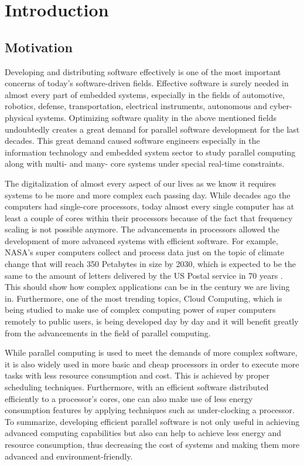 
\chapter{Introduction} \label{introductionchapter}
\section{Motivation}
Developing and distributing software effectively is one of the most important concerns of today's software-driven fields. Effective software is surely needed in almost every part of embedded systems, especially in the fields of automotive, robotics, defense, transportation, electrical instruments, autonomous and cyber-physical systems. Optimizing software quality in the above mentioned fields undoubtedly creates a great demand for parallel software development for the last decades. This great demand caused software engineers especially in the information technology and embedded system sector to study parallel computing along with multi- and many- core systems under special real-time constraints.

The digitalization of almost every aspect of our lives as we know it requires systems to be more and more complex each passing day. While decades ago the computers had single-core processors, today almost every single computer has at least a couple of cores within their processors because of the fact that frequency scaling is not possible anymore. The advancements in processors allowed the development of more advanced systems with efficient software. For example, NASA's super computers collect and process data just on the topic of climate change that will reach 350 Petabytes in size by 2030, which is expected to be the same to the amount of letters delivered by the US Postal service in 70 years \cite{nasachallenge}. This should show how complex applications can be in the century we are living in. Furthermore, one of the most trending topics, Cloud Computing, which is being studied to make use of complex computing power of super computers remotely to public users, is being developed day by day and it will benefit greatly from the advancements in the field of parallel computing.

While parallel computing is used to meet the demands of more complex software, it is also widely used in more basic and cheap processors in order to execute more tasks with less resource consumption and cost. This is achieved by proper scheduling techniques. Furthermore, with an efficient software distributed efficiently to a processor's cores, one can also make use of less energy consumption features by applying techniques such as under-clocking a processor. To summarize, developing efficient parallel software is not only useful in achieving advanced computing capabilities but also can help to achieve less energy and resource consumption, thus decreasing the cost of systems and making them more advanced and environment-friendly.

